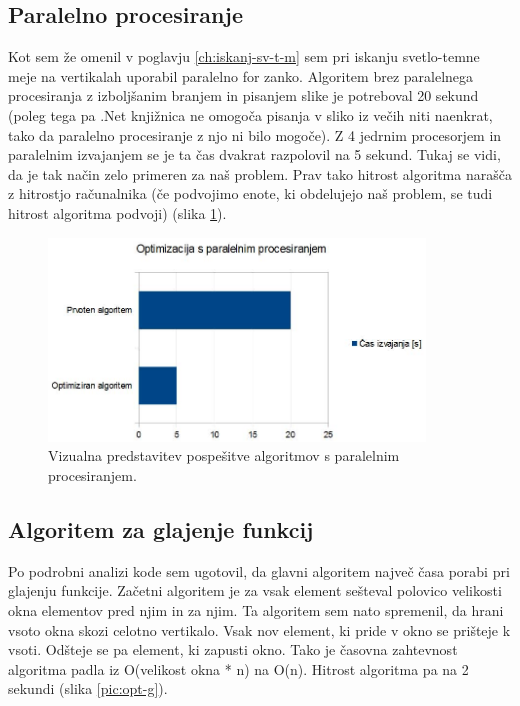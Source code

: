 \documentclass[oneside, a4paper, 12pt]{book}
\begin{document}
\subsection{Paralelno procesiranje}
Kot sem že omenil v poglavju \ref{ch:iskanj-sv-t-m} sem pri iskanju svetlo-temne meje na vertikalah uporabil paralelno for zanko. Algoritem brez paralelnega procesiranja z izboljšanim branjem in pisanjem slike je potreboval 20 sekund (poleg tega pa .Net knjižnica ne omogoča pisanja v sliko iz večih niti naenkrat, tako da paralelno procesiranje z njo ni bilo mogoče). Z 4 jedrnim procesorjem in paralelnim izvajanjem se je ta čas dvakrat razpolovil na 5 sekund. Tukaj se vidi, da je tak način zelo primeren za naš problem. Prav tako hitrost algoritma narašča z hitrostjo računalnika (če podvojimo enote, ki obdelujejo naš problem, se tudi hitrost algoritma podvoji) (slika \ref{pic:opt-p}).


\begin{figure}
\begin{center}
\includegraphics[width=10cm]{slike/optimizacija_grafi/optimizacija-s-paralelnim-procesiranjem.jpg}
\end{center}
\caption{Vizualna predstavitev pospešitve algoritmov s paralelnim procesiranjem.}
\label{pic:opt-p}
\end{figure}

\subsection{Algoritem za glajenje funkcij}
Po podrobni analizi kode sem ugotovil, da glavni algoritem največ časa porabi pri glajenju funkcije. Začetni algoritem je za vsak element sešteval polovico velikosti okna elementov pred njim in za njim. Ta algoritem sem nato spremenil, da hrani vsoto okna skozi celotno vertikalo. Vsak nov element, ki pride v okno se prišteje k vsoti. Odšteje se pa element, ki zapusti okno. Tako je časovna zahtevnost algoritma padla iz O(velikost okna * n) na O(n). Hitrost algoritma pa na 2 sekundi (slika \ref{pic:opt-g}).
\end{document}
